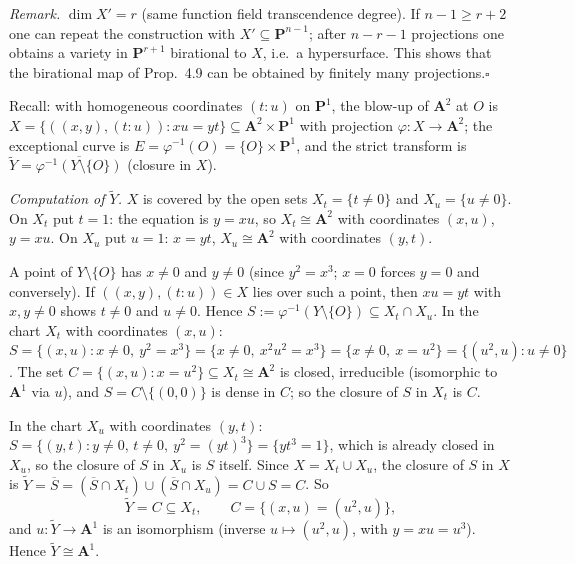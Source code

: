 \documentclass[11pt]{article}
\begin{document}
\emph{Remark.} $\dim X'=r$ (same function field transcendence degree). If $n-1\ge r+2$ one can repeat the construction with $X'\subseteq\mathbf P^{n-1}$; after $n-r-1$ projections one obtains a variety in $\mathbf P^{r+1}$ birational to $X$, i.e.\ a hypersurface. This shows that the birational map of Prop.~4.9 can be obtained by finitely many projections.\hfill$\square$

\pf
Recall: with homogeneous coordinates $(t:u)$ on $\mathbf P^1$, the blow-up of $\mathbf A^2$ at $O$ is $X=\{((x,y),(t:u)):xu=yt\}\subseteq\mathbf A^2\times\mathbf P^1$ with projection $\varphi:X\to\mathbf A^2$; the exceptional curve is $E=\varphi^{-1}(O)=\{O\}\times\mathbf P^1$, and the strict transform is $\tilde Y=\overline{\varphi^{-1}(Y\setminus\{O\})}$ (closure in $X$).

\emph{Computation of $\tilde Y$.} $X$ is covered by the open sets $X_t=\{t\ne0\}$ and $X_u=\{u\ne0\}$. On $X_t$ put $t=1$: the equation is $y=xu$, so $X_t\cong\mathbf A^2$ with coordinates $(x,u)$, $y=xu$. On $X_u$ put $u=1$: $x=yt$, $X_u\cong\mathbf A^2$ with coordinates $(y,t)$.

A point of $Y\setminus\{O\}$ has $x\ne0$ and $y\neq0$ (since $y^2=x^3$; $x=0$ forces $y=0$ and conversely). If $((x,y),(t:u))\in X$ lies over such a point, then $xu=yt$ with $x,y\ne0$ shows $t\ne0$ and $u\neq0$. Hence $S:=\varphi^{-1}(Y\setminus\{O\})\subseteq X_t\cap X_u$. In the chart $X_t$ with coordinates $(x,u)$: $S=\{(x,u):x\neq0,\ y^2=x^3\}=\{x\ne0,\ x^2u^2=x^3\}=\{x\ne0,\ x=u^2\}=\{(u^2,u):u\ne0\}$. The set $C=\{(x,u):x=u^2\}\subseteq X_t\cong\mathbf A^2$ is closed, irreducible (isomorphic to $\mathbf A^1$ via $u$), and $S=C\setminus\{(0,0)\}$ is dense in $C$; so the closure of $S$ in $X_t$ is $C$.

In the chart $X_u$ with coordinates $(y,t)$: $S=\{(y,t):y\ne0,\,t\neq0,\ y^2=(yt)^3\}=\{yt^3=1\}$, which is already closed in $X_u$, so the closure of $S$ in $X_u$ is $S$ itself. Since $X=X_t\cup X_u$, the closure of $S$ in $X$ is $\tilde Y=\overline S=(\overline S\cap X_t)\cup(\overline S\cap X_u)=C\cup S=C$. So
\[
\tilde Y=C\subseteq X_t,\qquad C=\{(x,u)=(u^2,u)\},
\]
and $u:\tilde Y\to\mathbf A^1$ is an isomorphism (inverse $u\mapsto(u^2,u)$, with $y=xu=u^3$). Hence $\tilde Y\cong\mathbf A^1$.
\end{document}
